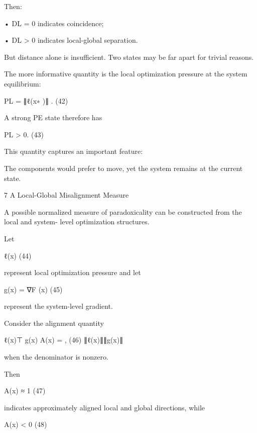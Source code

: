 \documentclass[10pt,a4paper]{article}
\begin{document}
\begin{ManuscriptText}
Then:


    • DL = 0 indicates coincidence;

    • DL > 0 indicates local-global separation.


But distance alone is insufficient. Two states may be far apart for trivial reasons.

The more informative quantity is the local optimization pressure at the system equilibrium:


                                         PL = ∥ℓ(x∗ )∥ .                                  (42)

A strong PE state therefore has


                                            PL > 0.                                       (43)

This quantity captures an important feature:


      The components would prefer to move, yet the system remains at the current state.


7     A Local-Global Misalignment Measure

A possible normalized measure of paradoxicality can be constructed from the local and system-
level optimization structures.

Let


                                                ℓ(x)                                      (44)

represent local optimization pressure and let


                                         g(x) = ∇F (x)                                    (45)


represent the system-level gradient.

Consider the alignment quantity


                                                 ℓ(x)⊤ g(x)
                                       A(x) =                ,                           (46)
                                                ∥ℓ(x)∥∥g(x)∥

when the denominator is nonzero.

Then


                                             A(x) ≈ 1                                    (47)

indicates approximately aligned local and global directions, while


                                             A(x) < 0                                    (48)


\end{ManuscriptText}
\end{document}
